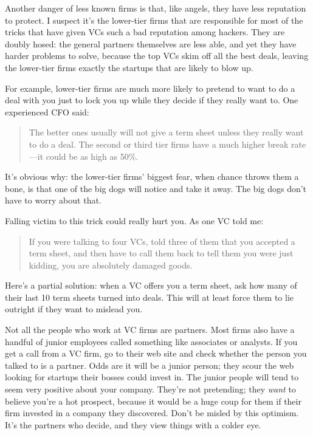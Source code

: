 \documentclass[12pt]{book}
\begin{document}
Another danger of less known firms is that, like angels, they have less
reputation to protect. I suspect it's the lower-tier firms that are
responsible for most of the tricks that have given VCs such a bad
reputation among hackers. They are doubly hosed: the general partners
themselves are less able, and yet they have harder problems to solve,
because the top VCs skim off all the best deals, leaving the lower-tier
firms exactly the startups that are likely to blow up.

For example, lower-tier firms are much more likely to pretend to want to
do a deal with you just to lock you up while they decide if they really
want to. One experienced CFO said:

\begin{quote}
The better ones usually will not give a term sheet unless they really
want to do a deal. The second or third tier firms have a much higher
break rate---it could be as high as 50\%.
\end{quote}

It's obvious why: the lower-tier firms' biggest fear, when chance throws
them a bone, is that one of the big dogs will notice and take it away.
The big dogs don't have to worry about that.

Falling victim to this trick could really hurt you. As one VC told me:

\begin{quote}
If you were talking to four VCs, told three of them that you accepted a
term sheet, and then have to call them back to tell them you were just
kidding, you are absolutely damaged goods.
\end{quote}

Here's a partial solution: when a VC offers you a term sheet, ask how
many of their last 10 term sheets turned into deals. This will at least
force them to lie outright if they want to mislead you.

Not all the people who work at VC firms are partners. Most firms also
have a handful of junior employees called something like associates or
analysts. If you get a call from a VC firm, go to their web site and
check whether the person you talked to is a partner. Odds are it will be
a junior person; they scour the web looking for startups their bosses
could invest in. The junior people will tend to seem very positive about
your company. They're not pretending; they \emph{want} to believe you're
a hot prospect, because it would be a huge coup for them if their firm
invested in a company they discovered. Don't be misled by this optimism.
It's the partners who decide, and they view things with a colder eye.
\end{document}
